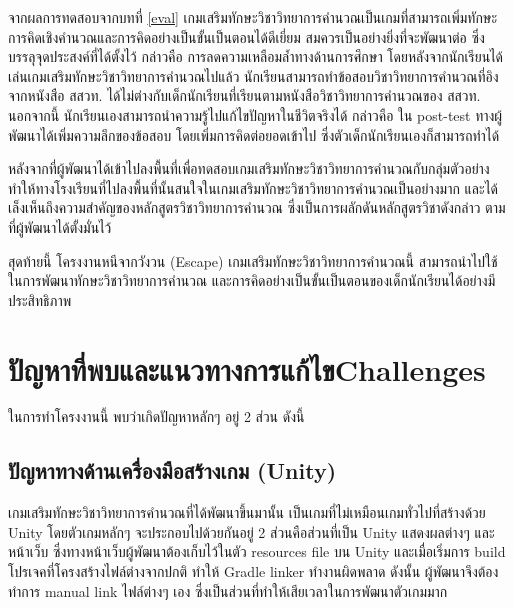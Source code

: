 จากผลการทดสอบจากบทที่ \ref{eval} เกมเสริมทักษะวิชาวิทยาการคำนวณเป็นเกมที่สามารถเพิ่มทักษะการคิดเชิงคำนวณและการคิดอย่างเป็นขั้นเป็นตอนได้ดีเยี่ยม สมควรเป็นอย่างยิ่งที่จะพัฒนาต่อ
ซึ่งบรรลุจุดประสงค์ที่ได้ตั้งไว้ กล่าวคือ การลดความเหลือมล้ำทางด้านการศึกษา โดยหลังจากนักเรียนได้เล่นเกมเสริมทักษะวิชาวิทยาการคำนวณไปแล้ว นักเรียนสามารถทำข้อสอบวิชาวิทยาการคำนวณที่อิงจากหนังสือ สสวท. ได้ไม่ต่างกับเด็กนักเรียนที่เรียนตามหนังสือวิชาวิทยาการคำนวณของ สสวท. 
นอกจากนี้ นักเรียนเองสามารถนำความรู้ไปแก้ไขปัญหาในชีวิตจริงได้ กล่าวคือ ใน post-test ทางผู้พัฒนาได้เพิ่มความลึกของข้อสอบ โดยเพิ่มการคิดต่อยอดเข้าไป ซึ่งตัวเด็กนักเรียนเองก็สามารถทำได้ 

หลังจากที่ผู้พัฒนาได้เข้าไปลงพื้นที่เพื่อทดสอบเกมเสริมทักษะวิชาวิทยาการคำนวณกับกลุ่มตัวอย่าง ทำให้ทางโรงเรียนที่ไปลงพื้นที่นั้นสนใจในเกมเสริมทักษะวิชาวิทยาการคำนวณเป็นอย่างมาก และได้เล็งเห็นถึงความสำคัญของหลักสูตรวิชาวิทยาการคำนวณ ซึ่งเป็นการผลักดันหลักสูตรวิชาดังกล่าว ตามที่ผู้พัฒนาได้ตั้งมั่นไว้

สุดท้ายนี้ โครงงานหนีจากวังวน (Escape) เกมเสริมทักษะวิชาวิทยาการคำนวณนี้ สามารถนำไปใช้ในการพัฒนาทักษะวิชาวิทยาการคำนวณ และการคิดอย่างเป็นขั้นเป็นตอนของเด็กนักเรียนได้อย่างมีประสิทธิภาพ


\section{\ifcpe ปัญหาที่พบและแนวทางการแก้ไข\else Challenges\fi}

ในการทำโครงงานนี้ พบว่าเกิดปัญหาหลักๆ อยู่ 2 ส่วน ดังนี้

\subsection{ปัญหาทางด้านเครื่องมือสร้างเกม (Unity)}
เกมเสริมทักษะวิชาวิทยาการคำนวณที่ได้พัฒนาขึ้นมานั้น เป็นเกมที่ไม่เหมือนเกมทั่วไปที่สร้างด้วย
Unity โดยตัวเกมหลักๆ จะประกอบไปด้วยกันอยู่ 2 ส่วนคือส่วนที่เป็น Unity แสดงผลต่างๆ และหน้าเว็บ ซึ่งทางหน้าเว็บผู้พัฒนาต้องเก็บไว้ในตัว resources file
บน Unity และเมื่อเริ่มการ build โปรเจคที่โครงสร้างไฟล์ต่างจากปกติ ทำให้ Gradle linker ทำงานผิดพลาด ดังนั้น ผู้พัฒนาจึงต้องทำการ manual link ไฟล์ต่างๆ เอง
ซึ่งเป็นส่วนที่ทำให้เสียเวลาในการพัฒนาตัวเกมมาก

